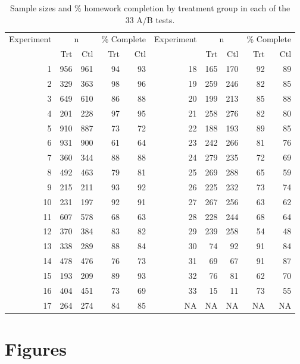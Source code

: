 \documentclass[12pt]{article}\usepackage[]{graphicx}\usepackage[]{xcolor}
\begin{document}
\begin{table}
\caption{\label{tab:info}Sample sizes and \% homework completion by treatment 
           group in each of the 33 A/B tests.}
\centering
\begin{tabular}[t]{r|r|r|r|>{}r||r|r|r|r|r}
\hline
\multicolumn{1}{c|}{Experiment} & \multicolumn{2}{c|}{n} & \multicolumn{2}{c|}{\% Complete} & \multicolumn{1}{c|}{Experiment} & \multicolumn{2}{c|}{n} & \multicolumn{2}{c}{\% Complete} \\
\cline{1-1} \cline{2-3} \cline{4-5} \cline{6-6} \cline{7-8} \cline{9-10}
 & Trt & Ctl & Trt & Ctl &  & Trt & Ctl & Trt & Ctl\\
\hline
1 & 956 & 961 & 94 & 93 & 18 & 165 & 170 & 92 & 89\\
\hline
2 & 329 & 363 & 98 & 96 & 19 & 259 & 246 & 82 & 85\\
\hline
3 & 649 & 610 & 86 & 88 & 20 & 199 & 213 & 85 & 88\\
\hline
4 & 201 & 228 & 97 & 95 & 21 & 258 & 276 & 82 & 80\\
\hline
5 & 910 & 887 & 73 & 72 & 22 & 188 & 193 & 89 & 85\\
\hline
6 & 931 & 900 & 61 & 64 & 23 & 242 & 266 & 81 & 76\\
\hline
7 & 360 & 344 & 88 & 88 & 24 & 279 & 235 & 72 & 69\\
\hline
8 & 492 & 463 & 79 & 81 & 25 & 269 & 288 & 65 & 59\\
\hline
9 & 215 & 211 & 93 & 92 & 26 & 225 & 232 & 73 & 74\\
\hline
10 & 231 & 197 & 92 & 91 & 27 & 267 & 256 & 63 & 62\\
\hline
11 & 607 & 578 & 68 & 63 & 28 & 228 & 244 & 68 & 64\\
\hline
12 & 370 & 384 & 83 & 82 & 29 & 239 & 258 & 54 & 48\\
\hline
13 & 338 & 289 & 88 & 84 & 30 & 74 & 92 & 91 & 84\\
\hline
14 & 478 & 476 & 76 & 73 & 31 & 69 & 67 & 91 & 87\\
\hline
15 & 193 & 209 & 89 & 93 & 32 & 76 & 81 & 62 & 70\\
\hline
16 & 404 & 451 & 73 & 69 & 33 & 15 & 11 & 73 & 55\\
\hline
17 & 264 & 274 & 84 & 85 & NA & NA & NA & NA & NA\\
\hline
\end{tabular}
\end{table}




\section{Figures}
\end{document}
